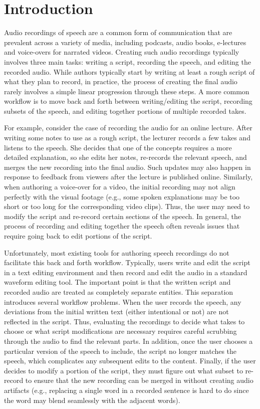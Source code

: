 \section{Introduction}

Audio recordings of speech are a common form of communication that are prevalent across a variety of media, including podcasts, audio books, e-lectures and voice-overs for narrated videos.
%
Creating such audio recordings typically involves three main tasks: writing a script, recording the speech, and editing the recorded audio. 
%
While authors typically start by writing at least a rough script of what they plan to record, in practice, the process of creating the final audio rarely involves a simple linear progression through these steps. A more common workflow is to move back and forth between writing/editing the script, recording subsets of the speech, and editing together portions of multiple recorded takes.

For example, consider the case of recording the audio for an online lecture. After writing some notes to use as a rough script, the lecturer records a few takes and listens to the speech. She decides that one of the concepts requires a more detailed explanation, so she edits her notes, re-records the relevant speech, and merges the new recording into the final audio. Such updates may also happen in response to feedback from viewers after the lecture is published online. Similarly, when authoring a voice-over for a video, the initial recording may not align perfectly with the visual footage (e.g., some spoken explanations may be too short or too long for the corresponding video clips). Thus, the user may need to modify the script and re-record certain sections of the speech. In general, the process of recording and editing together the speech often reveals issues that require going back to edit portions of the script.

Unfortunately, most existing tools for authoring speech recordings do not facilitate this back and forth workflow. Typically, users write and edit the script in a text editing environment and then record and edit the audio in a standard waveform editing tool. The important point is that the written script and recorded audio are treated as completely separate entities.
%
This separation introduces several workflow problems. When the user records the speech, any deviations from the initial written text (either intentional or not) are not reflected in the script. Thus, evaluating the recordings to decide what takes to choose or what script modifications are necessary requires careful scrubbing through the audio to find the relevant parts. In addition, once the user chooses a particular version of the speech to include, the script no longer matches the speech, which complicates any subsequent edits to the content. Finally, if the user decides to modify a portion of the script, they must figure out what subset to re-record to ensure that the new recording can be merged in without creating audio artifacts (e.g., replacing a single word in a recorded sentence is hard to do since the word may blend seamlessly with the adjacent words).

